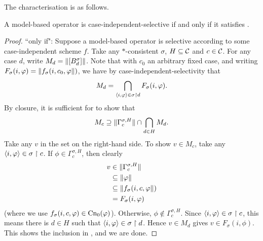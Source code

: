 The characterisation is as follows.

\begin{theorem}
    \label{kr_thm_case_independent_selectivity_characterisation}
    A model-based operator is case-independent-selective if and only if it
    satisfies \hboundedness{}.
\end{theorem}

\begin{proof}

    ``only if": Suppose a model-based operator is selective
    according to some case-independent scheme $f$. Take any $\ast$-consistent
    $\sigma$, $H \subseteq \mathcal{C}$ and $c \in \mathcal{C}$. For any case $d$, write $M_d =
    \|{\left[{B^\sigma_d}\right]}\|$. Note that with $c_0$ an
    arbitrary fixed case, and writing $F_\sigma(i, \varphi) =
    \|{f_\sigma(i, c_0, \varphi}\|)$, we have by case-independent-selectivity
    that
    \[
        M_d = \bigcap_{\langle {i, \varphi} \rangle \in \sigma \upharpoonright d}{
            F_\sigma(i, \varphi)
        }.
    \]
    By closure, it is sufficient for \hboundedness{} to show that
    \begin{equation}
        \label{kr_eqn_hbnd_inclusion}
        M_c
        \supseteq
        \|{\Gamma^{\sigma, H}_c}\| \cap \bigcap_{d \in H}{M_d}.
    \end{equation}
    Take any $v$ in the set on the right-hand side. To show $v \in M_c$, take
    any $\langle {i, \varphi} \rangle \in \sigma \upharpoonright c$. If $\phi \in \Gamma^{\sigma, H}_c$,
    then clearly
    \begin{align*}
        v
        &\in \|{\Gamma^{\sigma, H}_c}\| \\
        &\subseteq \|{\varphi}\| \\
        &\subseteq \|{f_\sigma(i, c, \varphi}\|) \\
        &= F_\sigma(i, \varphi)
    \end{align*}
    (where we use $f_\sigma(i, c, \varphi) \in \operatorname{Cn}_0(\varphi)$). Otherwise, $\phi
    \notin \Gamma^{\sigma, H}_c$. Since $\langle {i, \varphi} \rangle \in \sigma \upharpoonright c$,
    this means there is $d \in H$ such that $\langle {i, \varphi} \rangle \in \sigma \upharpoonright d$.
    Hence $v \in M_d$ gives $v \in F_\sigma(i, \phi)$. This shows the inclusion
    in , and we are done.


\end{proof}
